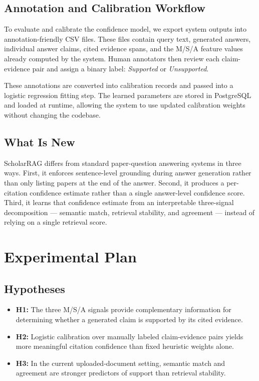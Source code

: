 \documentclass[10pt]{article}
\begin{document}
\subsection{Annotation and Calibration Workflow}

To evaluate and calibrate the confidence model, we export system
outputs into annotation-friendly CSV files. These files contain query
text, generated answers, individual answer claims, cited evidence
spans, and the M/S/A feature values already computed by the system.
Human annotators then review each claim-evidence pair and assign a
binary label: \textit{Supported} or \textit{Unsupported}.

These annotations are converted into calibration records and passed
into a logistic regression fitting step. The learned parameters are
stored in PostgreSQL and loaded at runtime, allowing the system to use
updated calibration weights without changing the codebase.

\subsection{What Is New}

ScholarRAG differs from standard paper-question answering systems in
three ways. First, it enforces sentence-level grounding during answer
generation rather than only listing papers at the end of the answer.
Second, it produces a per-citation confidence estimate rather than a
single answer-level confidence score. Third, it learns that confidence
estimate from an interpretable three-signal decomposition --- semantic
match, retrieval stability, and agreement --- instead of relying on a
single retrieval score.

\section{Experimental Plan}
\label{sec:experiments}

\subsection{Hypotheses}

\begin{itemize}
    \item \textbf{H1:} The three M/S/A signals provide complementary
    information for determining whether a generated claim is supported
    by its cited evidence.

    \item \textbf{H2:} Logistic calibration over manually labeled
    claim-evidence pairs yields more meaningful citation confidence
    than fixed heuristic weights alone.

    \item \textbf{H3:} In the current uploaded-document setting,
    semantic match and agreement are stronger predictors of support
    than retrieval stability.
\end{itemize}
\end{document}
